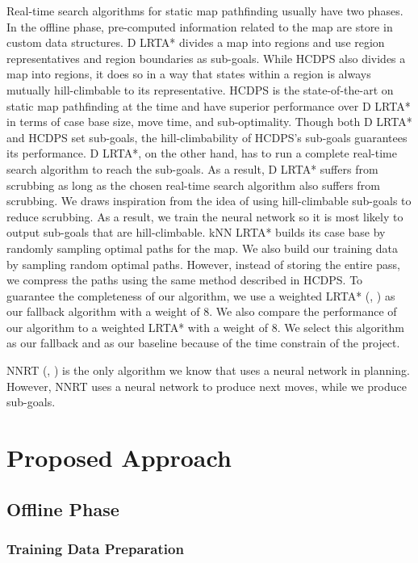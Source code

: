 \documentclass[letterpaper]{article}
\newcommand{\citea}[1]{(\citeauthor{#1}, \citeyear{#1})}
\numberwithin{equation}{section}
\numberwithin{theorem}{section}
\numberwithin{lemma}{section}
\numberwithin{df}{section}
\begin{document}
    Real-time search algorithms for static map pathfinding usually have two phases.
    In the offline phase, pre-computed information related to the map are store in custom data structures.
    D LRTA* divides a map into regions and use region representatives and region boundaries as sub-goals.
    While HCDPS also divides a map into regions, it does so in a way that states within a region is always mutually hill-climbable to its representative.
    HCDPS is the state-of-the-art on static map pathfinding at the time and have superior performance over D LRTA* in terms of case base size, move time, and sub-optimality.
    Though both D LRTA* and HCDPS set sub-goals, the hill-climbability of HCDPS's sub-goals guarantees its performance.
    D LRTA*, on the other hand, has to run a complete real-time search algorithm to reach the sub-goals.
    As a result, D LRTA* suffers from scrubbing as long as the chosen real-time search algorithm also suffers from scrubbing.
    We draws inspiration from the idea of using hill-climbable sub-goals to reduce scrubbing.
    As a result, we train the neural network so it is most likely to output sub-goals that are hill-climbable.
    kNN LRTA* builds its case base by randomly sampling optimal paths for the map.
    We also build our training data by sampling random optimal paths.
    However, instead of storing the entire pass, we compress the paths using the same method described in HCDPS.
    To guarantee the completeness of our algorithm, we use a weighted LRTA* \citea{wlrta} as our fallback algorithm with a weight of 8.
    We also compare the performance of our algorithm to a weighted LRTA* with a weight of 8.
    We select this algorithm as our fallback and as our baseline because of the time constrain of the project.

    NNRT \citea{nnrt} is the only algorithm we know that uses a neural network in planning.
    However, NNRT uses a neural network to produce next moves, while we produce sub-goals.

    \section{Proposed Approach}\label{sec:proposed-approach}

    \subsection{Offline Phase}

    \subsubsection{Training Data Preparation}
\end{document}
